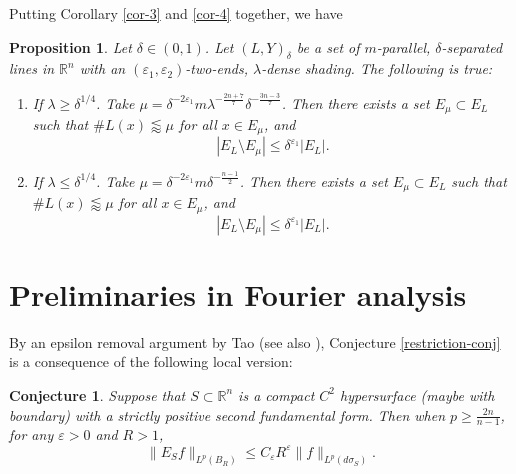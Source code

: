 \documentclass{amsart}
\numberwithin{equation}{section}
\newtheorem{proposition}[theorem]{Proposition}
\newtheorem{conjecture}[theorem]{Conjecture}
\newcommand{\de}{\delta}
\newcommand{\e}{\varepsilon}
\newcommand{\la}{\lambda}
\newcommand{\si}{\sigma}
\newcommand{\ZR}{\mathbb{R}}
\begin{document}
Putting Corollary \ref{cor-3} and \ref{cor-4} together, we have
\begin{proposition}
\label{kakeya-prop-high-d}
Let $\de\in(0,1)$.
Let $(L,Y)_\de$ be a set of $m$-parallel, $\de$-separated lines in $\ZR^n$ with an $(\e_1, \e_2)$-two-ends, $\la$-dense shading. 
The following is true:
\begin{enumerate}
    \item If $\la\geq \de^{1/4}$. Take $\mu=\de^{-2\e_1}m\la^{-\frac{2n+7}{7}}\de^{-\frac{3n-3}{7}}$.
    Then there exists a set $E_\mu\subset E_L$ such that $\# L(x)\lessapprox \mu$ for all $x\in E_\mu$, and
    \begin{equation}
        |E_L\setminus E_\mu|\leq \de^{\e_1}|E_L|.
    \end{equation}
    \item If $\la\leq \de^{1/4}$. Take $\mu=\de^{-2\e_1}m\de^{-\frac{n-1}{2}}$. 
    Then there exists a set $E_\mu\subset E_L$ such that $\# L(x)\lessapprox \mu$ for all $x\in E_\mu$, and
    \begin{equation}
        |E_L\setminus E_\mu|\leq \de^{\e_1}|E_L|.
    \end{equation}
\end{enumerate}



\end{proposition}



\bigskip



\section{Preliminaries in Fourier analysis}\label{section: fourier analysis}



By an epsilon removal argument by Tao \cite{Tao-BR-restriction} (see also \cite{Bourgain-Besicovitch}), Conjecture \ref{restriction-conj} is a consequence of  the following local version:

\begin{conjecture}
\label{restriction-conj-local-1}
Suppose that $S\subset\ZR^n$ is a compact $C^2$ hypersurface (maybe with boundary) with a strictly positive second fundamental form. 
Then when $p\geq\frac{2n}{n-1}$, for any $\e>0$ and $R>1$,
\begin{equation}
    \|E_Sf\|_{L^p(B_R)}\leq C_\e R^\e \|f\|_{L^p(d\si_S)}.
\end{equation}
\end{conjecture}
\end{document}
